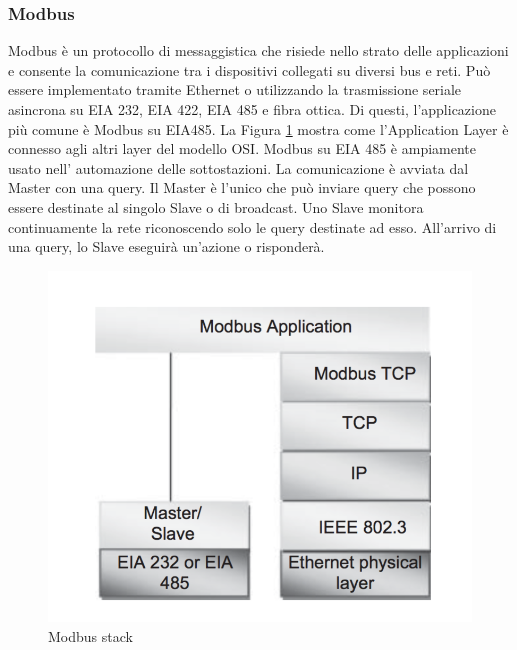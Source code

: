 \subsubsection{Modbus}
Modbus è un protocollo di messaggistica che risiede nello strato delle applicazioni e consente la comunicazione tra i dispositivi collegati su diversi bus e reti. Può essere implementato tramite Ethernet o utilizzando la trasmissione seriale asincrona su EIA 232, EIA 422, EIA 485 e fibra ottica. Di questi, l'applicazione più comune è Modbus su EIA485. La Figura \ref{fig:modbus} mostra come l'Application Layer è connesso agli altri layer del modello OSI.
Modbus su EIA 485 è ampiamente usato nell' automazione delle sottostazioni. La comunicazione è avviata dal Master con una query. Il Master è l'unico che può inviare query che possono essere destinate al singolo Slave o di broadcast. Uno Slave monitora continuamente la rete riconoscendo solo le query destinate ad esso.  All'arrivo di una query, lo Slave eseguirà un'azione o risponderà.
\begin{figure}[h]
	\centering
	\includegraphics[scale=0.350]{imgs/modbus.png}
	\caption{Modbus stack} \label{fig:modbus}
\end{figure}
